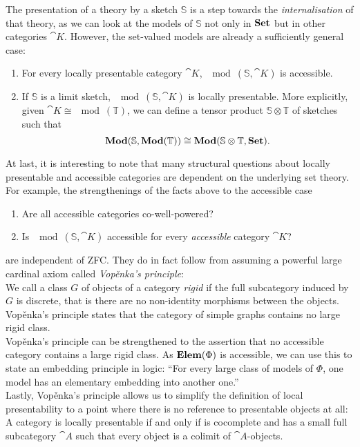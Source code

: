 The presentation of a theory by a sketch $\mathbb S$ is a step towards the \emph{internalisation} of that theory, as we can look at the models of $\mathbb S$ not only in $\mathbf{Set}$ but in other categories $\cat K$. However, the set-valued models are already a sufficiently general case:
\begin{enumerate}[resume]
\item For every locally presentable category $\cat K$, $\mod(\mathbb S, \cat K)$ is accessible.
\item If $\mathbb S$ is a limit sketch, $\mod(\mathbb S, \cat K)$ is locally presentable. More explicitly, given $\cat K \cong \mod(\mathbb T)$, we can define a tensor product $\mathbb S \otimes \mathbb T$ of sketches such that 
\[ \mathbf{Mod}(\mathbb S, \mathbf{Mod}(\mathbb T)) \cong \mathbf{Mod}(\mathbb S \otimes \mathbb T, \mathbf{Set}). \] 
\end{enumerate}

At last, it is interesting to note that many structural questions about locally presentable and accessible categories are dependent on the underlying set theory. For example, the strengthenings of the facts above to the accessible case

\begin{enumerate}[resume]
\item Are all accessible categories co-well-powered?
\item Is $\mod(\mathbb S, \cat K)$ accessible for every \emph{accessible} category $\cat K$?
\end{enumerate} 

are independent of ZFC. They do in fact follow from assuming a powerful large cardinal axiom called \emph{Vopěnka's principle}: \\

We call a class $G$ of objects of a category \emph{rigid} if the full subcategory induced by $G$ is discrete, that is there are no non-identity morphisms between the objects. Vopěnka's principle states that the category of simple graphs contains no large rigid class. \\

Vopěnka's principle can be strengthened to the assertion that no accessible category contains a large rigid class. As $\mathbf{Elem}(\Phi)$ is accessible, we can use this to state an embedding principle in logic: ``For every large class of models of $\Phi$, one model has an elementary embedding into another one.'' \\

Lastly, Vopěnka's principle allows us to simplify the definition of local presentability to a point where there is no reference to presentable objects at all: A category is locally presentable if and only if is cocomplete and has a small full subcategory $\cat A$ such that every object is a colimit of $\cat A$-objects.